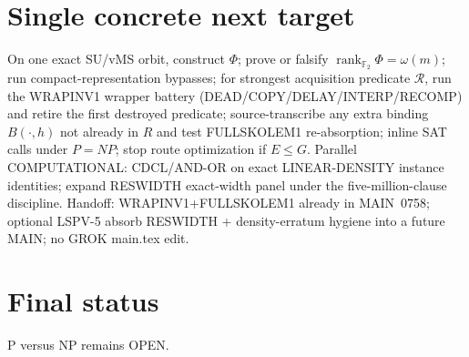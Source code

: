 \documentclass[11pt]{article}
\begin{document}
\section*{Single concrete next target}
On one exact SU/vMS orbit, construct $\Phi$; prove or falsify
$\boxed{\operatorname{rank}_{\mathbb F_2}\Phi=\omega(m)}$;
run compact-representation bypasses; for strongest acquisition predicate $\mathcal R$,
run the WRAPINV1 wrapper battery (DEAD/COPY/DELAY/INTERP/RECOMP) and retire the first
destroyed predicate; source-transcribe any extra binding $B(\cdot,h)$ not already in $R$ and
test FULLSKOLEM1 re-absorption; inline SAT calls under $P=NP$; stop route optimization if
$E\le G$. Parallel COMPUTATIONAL: CDCL/AND-OR on exact LINEAR-DENSITY instance identities;
expand RESWIDTH exact-width panel under the five-million-clause discipline.
Handoff: WRAPINV1+FULLSKOLEM1 already in MAIN~0758; optional LSPV-5 absorb RESWIDTH +
density-erratum hygiene into a future MAIN; no GROK main.tex edit.

\section*{Final status}
P versus NP remains OPEN.

\end{document}
